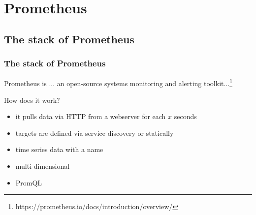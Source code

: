\section{Prometheus}
\subsection{The stack of Prometheus}
\begin{frame}
  \frametitle{The stack of Prometheus}   
  \begin{block}{Prometheus is ...}
    an open-source systems monitoring and alerting toolkit...\footnote{https://prometheus.io/docs/introduction/overview/}
  \end{block}
  
  How does it work?
  \begin{itemize}
   \item it pulls data via HTTP from a webserver for each $x$ seconds
   \item targets are defined via service discovery or statically
   \item time series data with a name\\ 
   \item multi-dimensional\\ 
   \item PromQL \\ 
  \end{itemize}
  
\end{frame}

